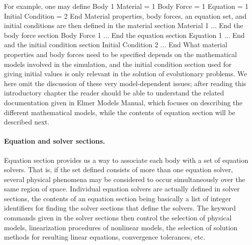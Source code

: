 For example, one may define 
\ttbegin
Body 1
  Material = 1
  Body Force = 1
  Equation = 1
  Initial Condition = 2
End
\ttend
Material properties, body forces, an equation set, and initial conditions 
are then defined in the material section 
\ttbegin
Material 1
  ...
End
\ttend
the body force section
\ttbegin
Body Force 1
  ...
End
\ttend
the equation section
\ttbegin
Equation 1
  ...
End
\ttend
and the initial condition section
\ttbegin
 Initial Condition 2
  ...
End
\ttend
What material properties and body forces need to be specified depends on the mathematical models 
involved in the simulation, and the initial condition section used for giving initial values is only relevant
in the solution of evolutionary problems. We here omit the discussion of these very model-dependent 
issues; after reading this introductory chapter the reader should be able to understand
the related documentation given in Elmer Models Manual, which focuses on describing the different mathematical models,
while the contents of equation section will be described next.




\paragraph{Equation and solver sections.}
Equation section provides us a way to associate each body with a set of equation solvers. 
That is, if the set defined consists of more than one equation solver, several physical phenomena 
may be considered to occur simultaneously over the same region of space.
Individual equation solvers are actually defined in solver sections, the contents of an equation section
being basically a list of integer identifiers for finding the solver sections that define the solvers.
The keyword commands given in the solver sections then control the selection of physical models, 
linearization procedures of nonlinear models, 
the selection of solution methods for resulting linear equations, convergence tolerances, etc.  

